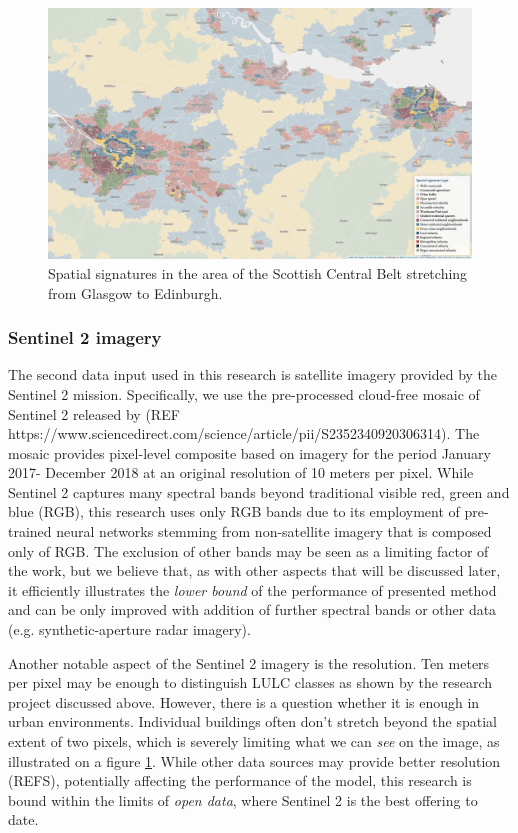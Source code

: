 \begin{figure}
    \centering
    \includegraphics[width=.8\linewidth]{fig/signatures_scotland.png}
    \caption{Spatial signatures in the area of the Scottish Central Belt stretching from Glasgow to Edinburgh.}
    \label{fig:signatures}
\end{figure}



\subsubsection{Sentinel 2 imagery}


The second data input used in this research is satellite imagery provided by the
Sentinel 2 mission. Specifically, we use the pre-processed cloud-free mosaic of Sentinel
2 released by (REF https://www.sciencedirect.com/science/article/pii/S2352340920306314).
The mosaic provides pixel-level composite based on imagery for the period January 2017-
December 2018 at an original resolution of 10 meters per pixel. While Sentinel 2
captures many spectral bands beyond traditional visible red, green and blue (RGB), this
research uses only RGB bands due to its employment of pre-trained neural networks
stemming from non-satellite imagery that is composed only of RGB. The exclusion of other
bands may be seen as a limiting factor of the work, but we believe that, as with other
aspects that will be discussed later, it efficiently illustrates the \textit{lower
bound} of the performance of presented method and can be only improved with addition of
further spectral bands or other data (e.g. synthetic-aperture radar imagery).

Another notable aspect of the Sentinel 2 imagery is the resolution. Ten meters per pixel
may be enough to distinguish LULC classes as shown by the research project discussed
above. However, there is a question whether it is enough in urban environments.
Individual buildings often don't stretch beyond the spatial extent of two pixels, which
is severely limiting what we can \textit{see} on the image, as illustrated on a figure
\ref{fig:signatures}. While other data sources may provide better resolution (REFS),
potentially affecting the performance of the model, this research is bound within the
limits of \textit{open data}, where Sentinel 2 is the best offering to date.


